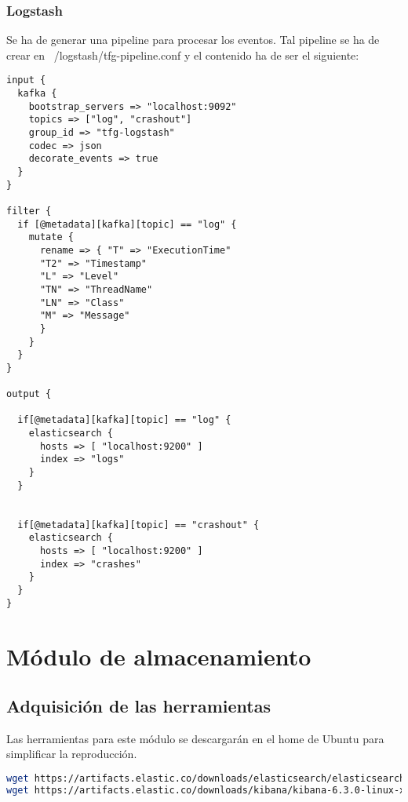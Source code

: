 \subsubsection{Logstash}
Se ha de generar una pipeline para procesar los eventos. Tal pipeline se ha de crear en ~/logstash/tfg-pipeline.conf y el contenido ha de ser el siguiente:

\begin{lstlisting}
input {
  kafka {
    bootstrap_servers => "localhost:9092"
    topics => ["log", "crashout"]
    group_id => "tfg-logstash"
    codec => json
    decorate_events => true
  }
}

filter {
  if [@metadata][kafka][topic] == "log" {
    mutate {
      rename => { "T" => "ExecutionTime"
      "T2" => "Timestamp"
      "L" => "Level"
      "TN" => "ThreadName"
      "LN" => "Class"
      "M" => "Message"
      }
    }
  }
}

output {

  if[@metadata][kafka][topic] == "log" {
    elasticsearch {
      hosts => [ "localhost:9200" ]
      index => "logs"
    }
  }


  if[@metadata][kafka][topic] == "crashout" {
    elasticsearch {
      hosts => [ "localhost:9200" ]
      index => "crashes"
    }
  }
}
\end{lstlisting}


\section{Módulo de almacenamiento}
\subsection{Adquisición de las herramientas}
Las herramientas para este módulo se descargarán en el home de Ubuntu para simplificar la reproducción.
\begin{lstlisting}[language=Bash, breaklines=true]
wget https://artifacts.elastic.co/downloads/elasticsearch/elasticsearch-6.3.0.tar.gz
wget https://artifacts.elastic.co/downloads/kibana/kibana-6.3.0-linux-x86_64.tar.gz
\end{lstlisting}

